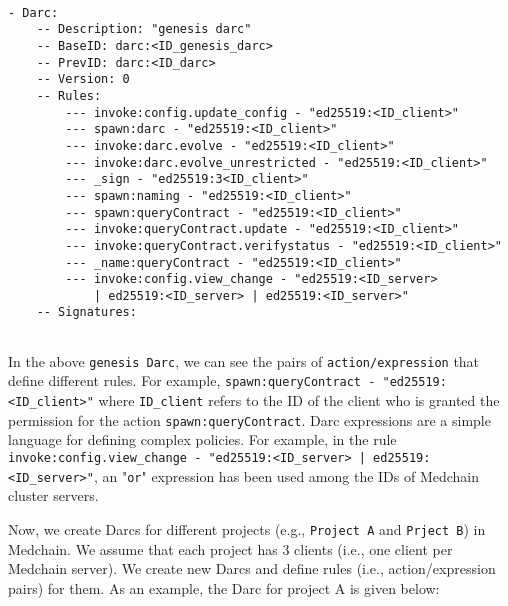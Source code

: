 \begin{verbatim}

- Darc:
    -- Description: "genesis darc"
    -- BaseID: darc:<ID_genesis_darc>
    -- PrevID: darc:<ID_darc>
    -- Version: 0
    -- Rules:
        --- invoke:config.update_config - "ed25519:<ID_client>"
        --- spawn:darc - "ed25519:<ID_client>"
        --- invoke:darc.evolve - "ed25519:<ID_client>"
        --- invoke:darc.evolve_unrestricted - "ed25519:<ID_client>"
        --- _sign - "ed25519:3<ID_client>"
        --- spawn:naming - "ed25519:<ID_client>"
        --- spawn:queryContract - "ed25519:<ID_client>"
        --- invoke:queryContract.update - "ed25519:<ID_client>"
        --- invoke:queryContract.verifystatus - "ed25519:<ID_client>"
        --- _name:queryContract - "ed25519:<ID_client>"
        --- invoke:config.view_change - "ed25519:<ID_server> 
            | ed25519:<ID_server> | ed25519:<ID_server>"
    -- Signatures:
    
\end{verbatim}

In the above \texttt{genesis Darc}, we can see the pairs of \texttt{action/expression} that define different rules. For example, \texttt{spawn:queryContract - "ed25519:<ID\_client>"} where \texttt{ID\_client} refers to the ID of the client who is granted the permission for the action \texttt{spawn:queryContract}. Darc expressions are a simple language for defining complex policies. For example, in the rule \texttt{invoke:config.view\_change - "ed25519:<ID\_server> | ed25519:<ID\_server>"}, an "\texttt{or}" expression has been used among the IDs of Medchain cluster servers. 

Now, we create Darcs for different projects (e.g., \texttt{Project A} and \texttt{Prject B}) in Medchain. We assume that each project has 3 clients (i.e., one client per Medchain server). We create new Darcs and define rules (i.e., action/expression pairs) for them. As an example, the Darc for project A is given below:

